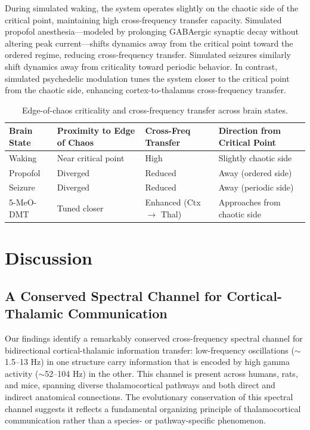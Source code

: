 \documentclass[12pt]{article}
\begin{document}
During simulated waking, the system operates slightly on the chaotic side of the critical point, maintaining high cross-frequency transfer capacity. Simulated propofol anesthesia---modeled by prolonging GABAergic synaptic decay without altering peak current---shifts dynamics away from the critical point toward the ordered regime, reducing cross-frequency transfer. Simulated seizures similarly shift dynamics away from criticality toward periodic behavior. In contrast, simulated psychedelic modulation tunes the system closer to the critical point from the chaotic side, enhancing cortex-to-thalamus cross-frequency transfer.

\begin{table}[H]
\centering
\caption{Edge-of-chaos criticality and cross-frequency transfer across brain states.}
\label{tab:criticality}
\begin{tabular}{llll}
\toprule
Brain State & Proximity to Edge of Chaos & Cross-Freq Transfer & Direction from Critical Point \\
\midrule
Waking & Near critical point & High & Slightly chaotic side \\
Propofol & Diverged & Reduced & Away (ordered side) \\
Seizure & Diverged & Reduced & Away (periodic side) \\
5-MeO-DMT & Tuned closer & Enhanced (Ctx $\to$ Thal) & Approaches from chaotic side \\
\bottomrule
\end{tabular}
\end{table}

\section{Discussion}

\subsection{A Conserved Spectral Channel for Cortical-Thalamic Communication}

Our findings identify a remarkably conserved cross-frequency spectral channel for bidirectional cortical-thalamic information transfer: low-frequency oscillations ($\sim$1.5--13 Hz) in one structure carry information that is encoded by high gamma activity ($\sim$52--104 Hz) in the other. This channel is present across humans, rats, and mice, spanning diverse thalamocortical pathways and both direct and indirect anatomical connections. The evolutionary conservation of this spectral channel suggests it reflects a fundamental organizing principle of thalamocortical communication rather than a species- or pathway-specific phenomenon.
\end{document}
